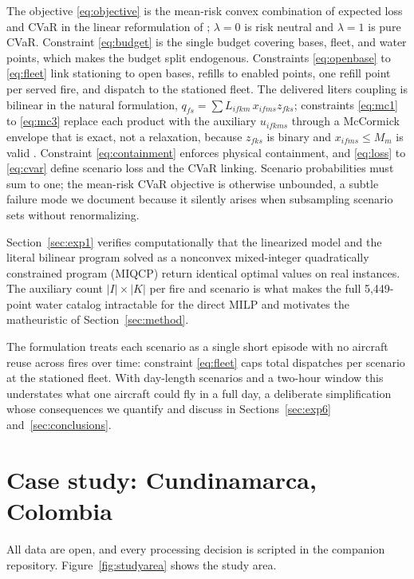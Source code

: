 \documentclass[11pt]{article}
\begin{document}
The objective \eqref{eq:objective} is the mean-risk convex combination
of expected loss and CVaR in the linear reformulation of
\citet{rockafellar2000}; $\lambda = 0$ is risk neutral and $\lambda =
1$ is pure CVaR. Constraint \eqref{eq:budget} is the single budget
covering bases, fleet, and water points, which makes the budget split
endogenous. Constraints \eqref{eq:openbase} to \eqref{eq:fleet} link
stationing to open bases, refills to enabled points, one refill point
per served fire, and dispatch to the stationed fleet. The delivered
liters coupling is bilinear in the natural formulation, $q_{fs} =
\sum L_{ifkm}\, x_{ifms} z_{fks}$; constraints \eqref{eq:mc1} to
\eqref{eq:mc3} replace each product with the auxiliary $u_{ifkms}$
through a McCormick envelope that is exact, not a relaxation, because
$z_{fks}$ is binary and $x_{ifms} \le M_m$ is valid
\citep{gupte2013}. Constraint
\eqref{eq:containment} enforces physical containment, and
\eqref{eq:loss} to \eqref{eq:cvar} define scenario loss and the CVaR
linking. Scenario probabilities must sum to one; the mean-risk CVaR
objective is otherwise unbounded, a subtle failure mode we document
because it silently arises when subsampling scenario sets without
renormalizing.

Section~\ref{sec:exp1} verifies computationally that the linearized
model and the literal bilinear program solved as a nonconvex
mixed-integer quadratically constrained program (MIQCP) return
identical optimal values on real instances. The
auxiliary count $|I| \times |K|$ per fire and scenario is what makes
the full 5,449-point water catalog intractable for the direct MILP and
motivates the matheuristic of Section~\ref{sec:method}.

The formulation treats each scenario as a single short episode with no
aircraft reuse across fires over time: constraint \eqref{eq:fleet}
caps total dispatches per scenario at the stationed fleet. With
day-length scenarios and a two-hour window this understates what one
aircraft could fly in a full day, a deliberate simplification whose
consequences we quantify and discuss in
Sections~\ref{sec:exp6} and~\ref{sec:conclusions}.

\section{Case study: Cundinamarca, Colombia}
\label{sec:data}

All data are open, and every processing decision is scripted in the
companion repository. Figure~\ref{fig:studyarea} shows the study area.
\end{document}
